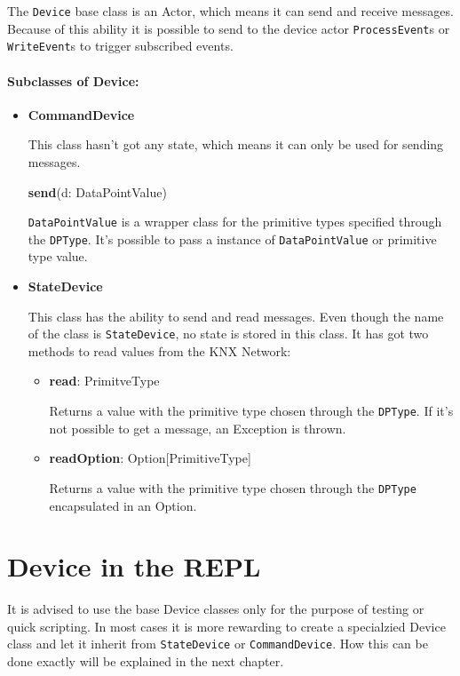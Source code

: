 The \lstinline!Device! base class is an Actor, which means it can send and receive messages. Because of this ability it is possible to send to the device actor \lstinline!ProcessEvent!s or \lstinline!WriteEvent!s to trigger subscribed events.

\paragraph{Subclasses of Device:}
\begin{itemize}
  \item \textbf{CommandDevice}

  This class hasn't got any state, which means it can only be used for sending messages.

    \textbf{send}(d: DataPointValue)

        \lstinline!DataPointValue! is a wrapper class for the primitive types specified through the \lstinline!DPType!. It's possible to pass a instance of \lstinline!DataPointValue! or primitive type value.
  \item \textbf{StateDevice}

  This class has the ability to send and read messages. Even though the name of the class is \lstinline!StateDevice!, no state is stored in this class. It has got two methods to read values from the KNX Network:
    \begin{itemize}
        \item \textbf{read}: PrimitveType

            Returns a value with the primitive type chosen through the \lstinline!DPType!. If it's not possible to get a message, an Exception is thrown.
        \item \textbf{readOption}: Option[PrimitiveType]

            Returns a value with the primitive type chosen through the \lstinline!DPType! encapsulated in an Option.
    \end{itemize}
\end{itemize}

\section{Device in the REPL}
It is advised to use the base Device classes only for the purpose of testing or quick scripting. In most cases it is more rewarding to create a specialzied Device class and let it inherit from \lstinline!StateDevice! or \lstinline!CommandDevice!. How this can be done exactly will be explained in the next chapter.

